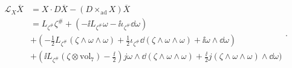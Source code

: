 \begin{equation}
    \begin{aligned}
    \mathscr{L}_X\overbar{X} &= X\cdot D \overbar{X}-(D\times_{\text{ad}}X)\overbar{X}\\
        &= L_{\zeta^{\#}}\zeta^{\#}+(-\ii L_{\zeta^{\#}}\omega-\ii\iota_{\zeta^{\#}}\dd\omega)\\
        &+(-\frac{1}{2}L_{\zeta^{\#}}(\zeta\wedge\omega\wedge\omega)+\frac{1}{2}\iota_{\zeta^{\#}}\dd(\zeta\wedge\omega\wedge\omega)+\ii\omega\wedge\dd\omega)\\
        &+(\ii L_{\zeta^{\#}}(\zeta\otimes\text{vol}_7)-\frac{\ii}{2})j\omega\wedge\dd(\zeta\wedge\omega\wedge\omega)+\frac{\ii}{2}j(\zeta\wedge\omega\wedge\omega)\wedge\dd\omega)
    \end{aligned}.
\end{equation}













